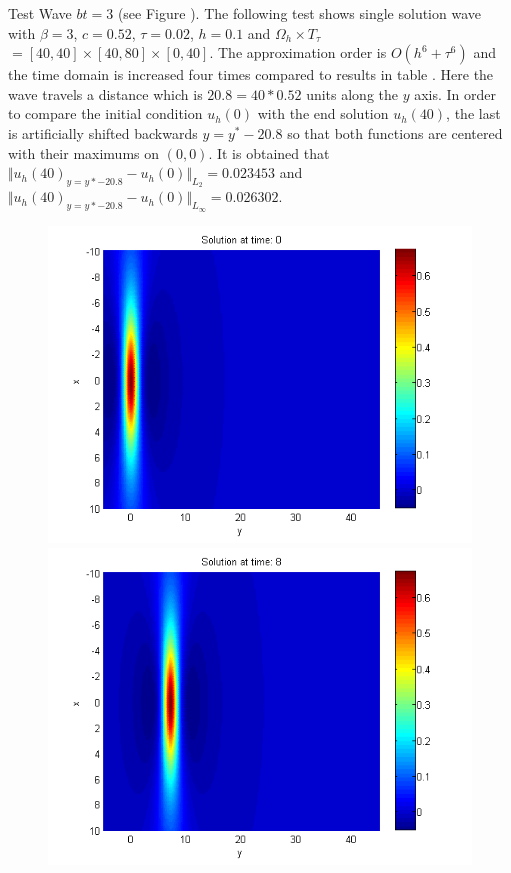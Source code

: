 \documentclass[11pt,a4paper,twoside]{article}
\begin{document}
Test Wave $bt = 3$ (see Figure ). The following test shows single solution wave with $\beta = 3$, $c = 0.52$, $\tau = 0.02$, $h = 0.1$ and $\Omega_h \times T_{\tau}$ $= [40, 40] \times [40, 80] \times [0, 40]$. The approximation order is $O(h^6 + \tau^6)$ and the time domain is increased four times compared to results in table . Here the wave travels a distance which is $20.8 = 40*0.52$ units along the $y$ axis. In order to compare the initial condition $u_h(0)$ with the end solution $u_h(40)$, the last is artificially shifted backwards $y = y^* - 20.8$ so that both functions are centered with their maximums on $(0,0)$. It is obtained that $\Vert u_h(40)_{y = y*-20.8} - u_h(0) \Vert_{L_2} = 0.023453 $ and $\Vert u_h(40)_{y = y*-20.8} - u_h(0) \Vert_{L_\infty} = 0.026302$. 
\begin{figure}[!htbp]
	\centering
	\begin{minipage}[b]{0.31\linewidth}
		\includegraphics[width=\linewidth]{Pictures/Solution1_t=0.png}
	\end{minipage}	
	\begin{minipage}[b]{0.31\linewidth}
		\includegraphics[width=\linewidth]{Pictures/Solution1_t=8.png}

\end{minipage}
\end{figure}
\end{document}
